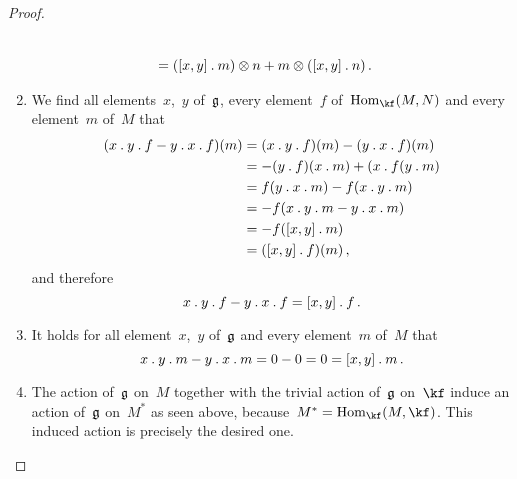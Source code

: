\begin{proof}
\begin{enumerate}
\begin{align*}
        \\
        ={}&
        ([x,y] \mathbin{.} m) \otimes n
        + m \otimes ([x,y] \mathbin{.} n) \,.
      \end{align*}
    \item
      We find all elements~$x$,~$y$ of~$\mathfrak{g}$, every element~$f$ of~$\Hom_{\kf}(M, N)$ and every element~$m$ of~$M$ that
      \begin{align*}
        (x \mathbin{.} y \mathbin{.} f - y \mathbin{.} x \mathbin{.} f)(m)
        &=
        (x \mathbin{.} y \mathbin{.} f)(m) - (y \mathbin{.} x \mathbin{.} f)(m)
        \\
        &=
        -(y \mathbin{.} f)(x \mathbin{.} m) + (x \mathbin{.} f(y \mathbin{.} m)
        \\
        &=
        f(y \mathbin{.} x \mathbin{.} m) - f(x \mathbin{.} y \mathbin{.} m)
        \\
        &=
        -f(x \mathbin{.} y \mathbin{.} m - y \mathbin{.} x \mathbin{.} m)
        \\
        &=
        -f([x,y] \mathbin{.} m)
        \\
        &=
        ([x,y] \mathbin{.} f)(m)  \,,
      \end{align*}
      and therefore
      \[
        x \mathbin{.} y \mathbin{.} f - y \mathbin{.} x \mathbin{.} f
        =
        [x,y] \mathbin{.} f \,.
      \]
    \item
      It holds for all element~$x$,~$y$ of~$\mathfrak{g}$ and every element~$m$ of~$M$ that
      \[
        x \mathbin{.} y \mathbin{.} m - y \mathbin{.} x \mathbin{.} m
        =
        0 - 0
        =
        0
        =
        [x,y] \mathbin{.} m \,.
      \]
    \item
      The action of~$\mathfrak{g}$ on~$M$ together with the trivial action of~$\mathfrak{g}$ on~$\kf$ induce an action of~$\mathfrak{g}$ on~$M^*$ as seen above, because~$M^* = \Hom_{\kf}(M, \kf)$.
      This induced action is precisely the desired one.
    \qedhere
  \end{enumerate}
\end{proof}


